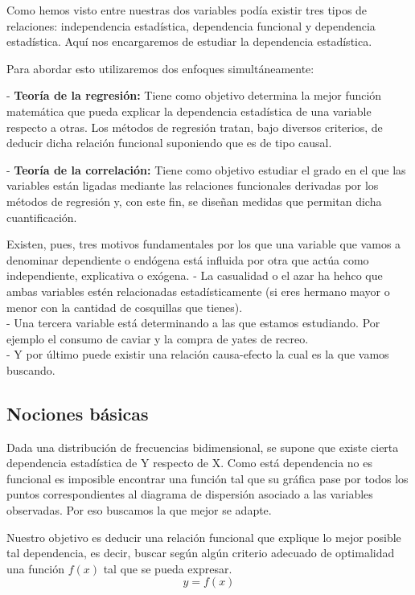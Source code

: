 \documentclass{article}
\begin{document}
	Como hemos visto entre nuestras dos variables podía existir tres tipos de relaciones: independencia estadística, dependencia funcional y dependencia estadística. Aquí nos encargaremos de estudiar la dependencia estadística.
	\vspace{2mm}
	
	Para abordar esto utilizaremos dos enfoques simultáneamente:
	
	 - \textbf{Teoría de la regresión:} Tiene como objetivo determina la mejor función matemática que pueda explicar la dependencia estadística de una variable respecto a otras. Los métodos de regresión tratan, bajo diversos criterios, de deducir dicha relación funcional suponiendo que es de tipo causal.
	 
	 \vspace{2mm}
	 - \textbf{Teoría de la correlación:} Tiene como objetivo estudiar el grado en el que las variables están ligadas mediante las relaciones funcionales derivadas por los métodos de regresión y, con este fin, se diseñan medidas que permitan dicha cuantificación.
	 
	 \vspace{2mm}
	 Existen, pues, tres motivos fundamentales por los que una variable que vamos a denominar dependiente o endógena está influida por otra que actúa como independiente, explicativa o exógena.
	 - La casualidad o el azar ha hehco que ambas variables estén relacionadas estadísticamente (si eres hermano mayor o menor con la cantidad de cosquillas que tienes).\\
	 - Una tercera variable está determinando a las que estamos estudiando. Por ejemplo el consumo de caviar y la compra de yates de recreo.\\
	 - Y por último puede existir una relación causa-efecto la cual es la que vamos buscando.
	 \subsection{Nociones básicas}
	 
	 Dada una distribución de frecuencias bidimensional, se supone que existe cierta dependencia estadística de Y respecto de X.
	 Como está dependencia no es funcional es imposible encontrar una función tal que su gráfica pase por todos los puntos correspondientes al diagrama de dispersión asociado a las variables observadas. Por eso buscamos la que mejor se adapte.
	 
	  Nuestro objetivo es deducir una relación funcional que explique lo mejor posible tal dependencia, es decir, buscar según algún criterio adecuado de optimalidad una función $f(x)$ tal que se pueda expresar.
	 $$ y = f(x) $$
	 
\end{document}
